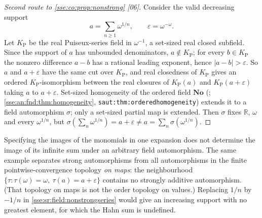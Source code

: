 \documentclass[11pt,a4paper]{article}
\numberwithin{equation}{section}
\theoremstyle{plain}
\theoremstyle{definition}
\theoremstyle{remark}
\newcommand{\No}{\mathbf{No}}
\newcommand{\R}{\mathbb{R}}
\newcommand{\lbl}[1]{\nolinkurl{#1}}%
\newcommand{\src}[1]{\textup{\textsf{\small[#1]}}}%
\begin{document}
\begin{proof}[Second route to \cref{sse:co:prop:nonstrong} \src{06}]
Consider the valid decreasing support
\begin{equation}\label{sse:sr:field:nonstrongseries}
 a=\sum_{n\ge1}\omega^{1/n},\qquad \varepsilon=\omega^{-\omega}.
\end{equation}
Let $K_{\mathrm P}$ be the real Puiseux-series field in $\omega^{-1}$, a
set-sized real closed subfield. Since the support of $a$ has unbounded
denominators, $a\notin K_{\mathrm P}$; for every $b\in K_{\mathrm P}$ the
nonzero difference $a-b$ has a rational leading exponent, hence
$|a-b|>\varepsilon$. So $a$ and $a+\varepsilon$ have the same cut over
$K_{\mathrm P}$, and real closedness of $K_{\mathrm P}$ gives an ordered
$K_{\mathrm P}$-isomorphism between the real closures of $K_{\mathrm P}(a)$ and
$K_{\mathrm P}(a+\varepsilon)$ taking $a$ to $a+\varepsilon$. Set-sized
homogeneity of the ordered field $\No$ (\cite[Remark~2.10]{KKS};
\cref{sse:an:fnd:thm:homogeneity}, \lbl{saut:thm:orderedhomogeneity}) extends it
to a field automorphism $\sigma$; only a set-sized partial map is extended.
Then $\sigma$ fixes $\R$, $\omega$ and every $\omega^{1/n}$, but
$\sigma(\sum_n\omega^{1/n})=a+\varepsilon\ne a=\sum_n\sigma(\omega^{1/n})$.
\end{proof}
Specifying the images of the monomials in one expansion does not determine
the image of its infinite sum under an arbitrary field automorphism. The
same example separates strong automorphisms from all automorphisms in the
finite pointwise-convergence topology \emph{on maps}: the neighbourhood
$\{\tau:\tau(\omega)=\omega,\ \tau(a)=a+\varepsilon\}$ contains no strongly
additive automorphism. (That topology on maps is not the order topology on
values.) Replacing $1/n$ by $-1/n$ in \eqref{sse:sr:field:nonstrongseries}
would give an increasing support with no greatest element, for which the
Hahn sum is undefined.
\end{document}

